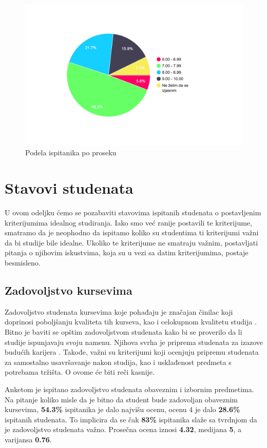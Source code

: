 \documentclass[a4paper]{article}
\begin{document}
{\begin{figure}[H]
    \centering
    \includegraphics[width=0.7\linewidth]{Slike/PieChartProsek.png}
    \caption{Podela ispitanika po proseku}
    \label{fig:raspodela_prosek}
\end{figure}

\section{Stavovi studenata}
\label{sec:stavovi}


U ovom odeljku ćemo se pozabaviti stavovima ispitanih studenata o postavljenim kriterijumima idealnog studiranja. Iako smo već ranije postavili te kriterijume, smatramo da je neophodno da ispitamo koliko su studentima ti kriterijumi važni da bi studije bile idealne. Ukoliko te kriterijume ne smatraju važnim, postavljati pitanja o njihovim iskustvima, koja su u vezi sa datim kriterijumima, postaje besmisleno.


\subsection{Zadovoljstvo kursevima}
\label{subsec:zadovoljstvo_stavovi}

Zadovoljstvo studenata kursevima koje pohađaju je značajan činilac koji doprinosi poboljšanju kvaliteta tih kurseva, kao i celokupnom kvalitetu studija \cite{satisfaction}. Bitno je baviti se opštim zadovoljstvom studenata kako bi se proverilo da li studije ispunjavaju svoju namenu. Njihova svrha je priprema studenata za izazove budućih karijera \cite{education}. Takođe, važni su kriterijumi koji ocenjuju pripremu studenata za samostalno usavršavanje nakon studija, kao i usklađenost predmeta s potrebama tržišta. O ovome će biti reči kasnije.

Anketom je ispitano zadovoljstvo studenata obaveznim i izbornim predmetima. Na pitanje koliko misle da je bitno da student bude zadovoljan obaveznim kursevima, \textbf{54.3\%} ispitanika je dalo najvišu ocenu, ocenu 4 je dalo \textbf{28.6\%} ispitanih studenata. To implicira da se čak \textbf{83\%} ispitanika slaže sa tvrdnjom da je zadovoljstvo studenata važno. Prosečna ocena iznosi \textbf{4.32}, medijana \textbf{5}, a varijansa \textbf{0.76}.

}
\end{document}
